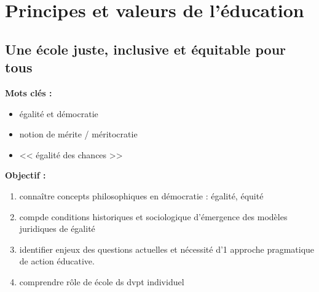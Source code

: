 \documentclass[12pt]{report}
\begin{document}
\tableofcontents

\part{Principes et valeurs de l'éducation}

\chapter{Une école juste, inclusive et équitable pour tous}

\textbf{Mots clés : }
\begin{itemize}
\item égalité et démocratie
\item notion de mérite / méritocratie
\item << égalité des chances >>
\end{itemize}

\vspace{0.5cm}

\textbf{Objectif :}


\begin{enumerate}
\item connaître concepts philosophiques en démocratie : égalité, équité
\item compde conditions historiques et sociologique d'émergence des modèles juridiques de égalité
\item identifier enjeux des questions actuelles et nécessité d'1 approche pragmatique de action éducative.
\item comprendre rôle de école ds dvpt individuel \\
\end{enumerate}
\end{document}
